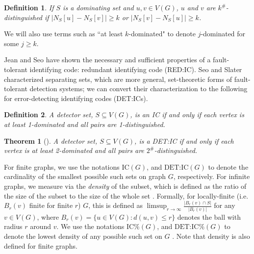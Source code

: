 \documentclass{article}
\newtheorem{definition}{Definition}
\newtheorem{theorem}{Theorem}[section]
\begin{document}
\begin{definition}\label{def:k-sharp-disty}
If $S$ is a dominating set and $u,v \in V(G)$, $u$ and $v$ are \emph{$k^\#$-distinguished} if $|N_S[u] - N_S[v]| \ge k$ or $|N_S[v] - N_S[u]| \ge k$.
\end{definition}

We will also use terms such as ``at least $k$-dominated" to denote $j$-dominated for some $j \ge k$.

\vspace{0.6em}
Jean and Seo \cite{redic} have shown the necessary and sufficient properties of a fault-tolerant identifying code: redundant identifying code (RED:IC).
Seo and Slater \cite{separating} characterized separating sets, which are more general, set-theoretic forms of fault-tolerant detection systems; we can convert their characterization to the following for error-detecting identifying codes (DET:ICs).

\begin{definition}\label{def:ic-char}
A detector set, $S \subseteq V(G)$, is an IC if and only if each vertex is at least 1-dominated and all pairs are 1-distinguished.
\end{definition}

\begin{theorem}[\cite{separating}]\label{theo:detic-char}
A detector set, $S \subseteq V(G)$, is a DET:IC if and only if each vertex is at least 2-dominated and all pairs are $2^\#$-distinguished.
\end{theorem}

For finite graphs, we use the notations $\textrm{IC}(G)$, and $\textrm{DET:IC}(G)$ to denote the cardinality of the smallest possible such sets on graph $G$, respectively.
For infinite graphs, we measure via the \emph{density} of the subset, which is defined as the ratio of the size of the subset to the size of the whole set \cite{ourtri,ftsets}.
Formally, for locally-finite (i.e. $B_r(v)$ finite for finite $r$) $G$, this is defined as $\limsup_{r \to \infty}{\frac{|B_r(v) \cap S|}{|B_r(v)|}}$ for any $v \in V(G)$, where $B_r(v) = \{ u \in V(G) : d(u,v) \le r\}$ denotes the ball with radius $r$ around $v$.
We use the notations $\textrm{IC\%}(G)$, and $\textrm{DET:IC\%}(G)$ to denote the lowest density of any possible such set on $G$ \cite{ourtri,ftsets}.
Note that density is also defined for finite graphs.
\end{document}
